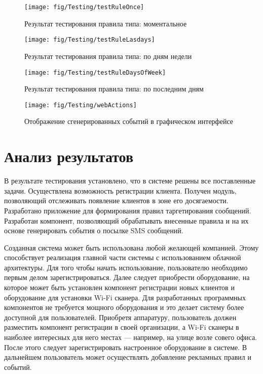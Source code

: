 \begin{figure}[h]
	\centering
	\texttt{[image: fig/Testing/testRuleOnce]}
	\caption{Результат тестирования правила типа: моментальное}
	\label{fig:testRuleOnce}
\end{figure}

\begin{figure}[h]
	\centering
	\texttt{[image: fig/Testing/testRuleLasdays]}
	\caption{Результат тестирования правила типа: по дням недели}
	\label{fig:testRuleLasdays}
\end{figure}

\begin{figure}[h]
	\centering
	\texttt{[image: fig/Testing/testRuleDaysOfWeek]}
	\caption{Результат тестирования правила типа: по последним дням}
	\label{fig:testRuleDaysOfWeek}
\end{figure}

\begin{figure}[h]
	\centering
	\texttt{[image: fig/Testing/webActions]}
	\caption{Отображение сгенерированных событий в графическом интерфейсе}
	\label{fig:webActions}
\end{figure}


\section{Анализ результатов}

В результате тестирования установлено, что в системе решены все поставленные задачи. Осуществлена возможность регистрации клиента. Получен модуль, позволяющий отслеживать появление клиентов в зоне его досягаемости. Разработано приложение для формирования правил таргетирования сообщений. Разработан компонент, позволяющий обрабатывать внесенные правила и на их основе генерировать события о посылке SMS сообщений.

Созданная система может быть использована любой желающей компанией. Этому способствует реализация главной части системы с использованием облачной архитектуры. Для того чтобы начать использование, пользователю необходимо первым делом зарегистрироваться. Далее следует приобрести оборудование, на которое может быть установлен компонент регистрации новых клиентов и оборудование для установки Wi-Fi сканера. Для разработанных программных компонентов не требуется мощного оборудования и это делает систему более доступной для пользователей. Приобретя аппаратуру, пользователь должен разместить компонент регистрации в своей организации, а Wi-Fi сканеры в наиболее интересных для него местах --- например, на улице возле совего офиса. После этого следует зарегистрировать настроенное оборудование в системе. В дальнейшем пользователь может осуществлять добавление рекламных правил и событий.

